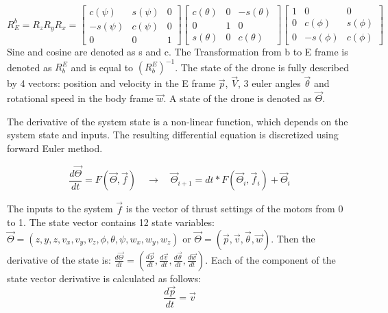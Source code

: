 \begin{equation}
\label{eq:transformation}
    R_{E}^{b} = R_z R_y R_x = 
    \begin{bmatrix}
     c(\psi) & s(\psi) & 0\\
     -s(\psi) & c(\psi) & 0\\
     0 & 0 & 1
    \end{bmatrix}
    \begin{bmatrix}
     c(\theta) & 0 & -s(\theta)\\
     0 & 1 & 0\\
     s(\theta) & 0 & c(\theta)
    \end{bmatrix}
    \begin{bmatrix}
     1 & 0 & 0\\
     0 & c(\phi) & s(\phi)\\
     0 & -s(\phi) & c(\phi)
    \end{bmatrix}
\end{equation}
Sine and cosine are denoted as s and c. The Transformation from b to E frame is denoted as $R_{b}^{E}$ and is equal to $(R_{b}^{E})^{-1}$.
The state of the drone is fully described by 4 vectors: position and velocity in the E frame $\vec{p}$, $\vec{V}$, 3 euler angles $\vec{\theta}$  and rotational speed in the body frame $\vec{w}$. A state of the drone is denoted as $\vec{\Theta}$.  


The derivative of the system state is a non-linear function, which depends on the system state and inputs. The resulting differential equation is discretized using forward Euler method. 

\begin{equation}
    \frac{d\vec{\Theta}}{dt} = F(\vec{\Theta},\vec{f})  
    \quad \rightarrow \quad
    \vec{\Theta}_{i+1} = dt*F(\vec{\Theta}_i,\vec{f}_i) + \vec{\Theta}_i
\end{equation}

The inputs to the system $\vec{f}$ is the vector of thrust settings of the motors from 0 to 1. The state vector contains 12 state variables: $\vec{\Theta} = (z,y,z,v_x,v_y,v_z,\phi,\theta,\psi,w_x,w_y,w_z)$ or $\vec{\Theta} =(\vec{p}, \vec{v}, \vec{\theta}, \vec{w})$. Then the derivative of the state is: $\frac{d\vec{\Theta}}{dt} =(\frac{d\vec{p}}{dt}, \frac{d\vec{v}}{dt}, \frac{d\vec{\theta}}{dt}, \frac{d\vec{w}}{dt})$. Each of the component of the state vector derivative is calculated as follows: 
\begin{equation}
\label{eq:position_derivative}
   \frac{d\vec{p}}{dt} = \vec{v}
\end{equation}

